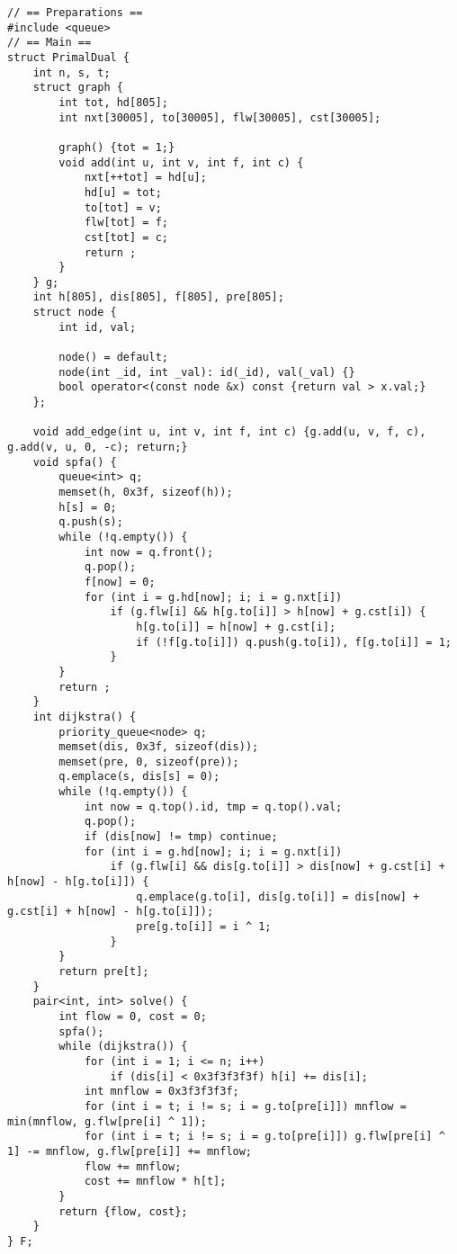 \begin{verbatim}
// == Preparations ==
#include <queue>
// == Main ==
struct PrimalDual {
    int n, s, t;
    struct graph {
        int tot, hd[805];
        int nxt[30005], to[30005], flw[30005], cst[30005];

        graph() {tot = 1;}
        void add(int u, int v, int f, int c) {
            nxt[++tot] = hd[u];
            hd[u] = tot;
            to[tot] = v;
            flw[tot] = f;
            cst[tot] = c;
            return ;
        }
    } g;
    int h[805], dis[805], f[805], pre[805];
    struct node {
        int id, val;

        node() = default;
        node(int _id, int _val): id(_id), val(_val) {}
        bool operator<(const node &x) const {return val > x.val;}
    };

    void add_edge(int u, int v, int f, int c) {g.add(u, v, f, c), g.add(v, u, 0, -c); return;}
    void spfa() {
        queue<int> q;
        memset(h, 0x3f, sizeof(h));
        h[s] = 0;
        q.push(s);
        while (!q.empty()) {
            int now = q.front();
            q.pop();
            f[now] = 0;
            for (int i = g.hd[now]; i; i = g.nxt[i])
                if (g.flw[i] && h[g.to[i]] > h[now] + g.cst[i]) {
                    h[g.to[i]] = h[now] + g.cst[i];
                    if (!f[g.to[i]]) q.push(g.to[i]), f[g.to[i]] = 1;
                }
        }
        return ;
    }
    int dijkstra() {
        priority_queue<node> q;
        memset(dis, 0x3f, sizeof(dis));
        memset(pre, 0, sizeof(pre));
        q.emplace(s, dis[s] = 0);
        while (!q.empty()) {
            int now = q.top().id, tmp = q.top().val;
            q.pop();
            if (dis[now] != tmp) continue;
            for (int i = g.hd[now]; i; i = g.nxt[i])
                if (g.flw[i] && dis[g.to[i]] > dis[now] + g.cst[i] + h[now] - h[g.to[i]]) {
                    q.emplace(g.to[i], dis[g.to[i]] = dis[now] + g.cst[i] + h[now] - h[g.to[i]]);
                    pre[g.to[i]] = i ^ 1;
                }
        }
        return pre[t];
    }
    pair<int, int> solve() {
        int flow = 0, cost = 0;
        spfa();
        while (dijkstra()) {
            for (int i = 1; i <= n; i++)
                if (dis[i] < 0x3f3f3f3f) h[i] += dis[i];
            int mnflow = 0x3f3f3f3f;
            for (int i = t; i != s; i = g.to[pre[i]]) mnflow = min(mnflow, g.flw[pre[i] ^ 1]);
            for (int i = t; i != s; i = g.to[pre[i]]) g.flw[pre[i] ^ 1] -= mnflow, g.flw[pre[i]] += mnflow;
            flow += mnflow;
            cost += mnflow * h[t];
        }
        return {flow, cost};
    }
} F;
\end{verbatim}

